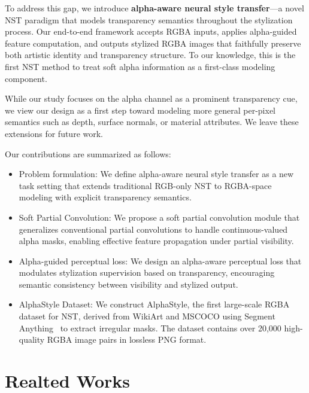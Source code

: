 \documentclass[letterpaper]{article} %
\begin{document}
To address this gap, we introduce \textbf{alpha-aware neural style transfer}—a novel NST paradigm that models transparency semantics throughout the stylization process. Our end-to-end framework accepts RGBA inputs, applies alpha-guided feature computation, and outputs stylized RGBA images that faithfully preserve both artistic identity and transparency structure. To our knowledge, this is the first NST method to treat soft alpha information as a first-class modeling component.

While our study focuses on the alpha channel as a prominent transparency cue, we view our design as a first step toward modeling more general per-pixel semantics such as depth, surface normals, or material attributes. We leave these extensions for future work.

Our contributions are summarized as follows:
\begin{itemize}
    \item {Problem formulation}: We define alpha-aware neural style transfer as a new task setting that extends traditional RGB-only NST to RGBA-space modeling with explicit transparency semantics.
    \item {Soft Partial Convolution}: We propose a soft partial convolution module that generalizes conventional partial convolutions to handle continuous-valued alpha masks, enabling effective feature propagation under partial visibility.
    \item {Alpha-guided perceptual loss}: We design an alpha-aware perceptual loss that modulates stylization supervision based on transparency, encouraging semantic consistency between visibility and stylized output.
    \item {AlphaStyle Dataset}: We construct AlphaStyle, the first large-scale RGBA dataset for NST, derived from WikiArt and MSCOCO using Segment Anything~\cite{kirillov2023segment} to extract irregular masks. The dataset contains over 20,000 high-quality RGBA image pairs in lossless PNG format.
\end{itemize}

\section{Realted Works}


\end{document}
